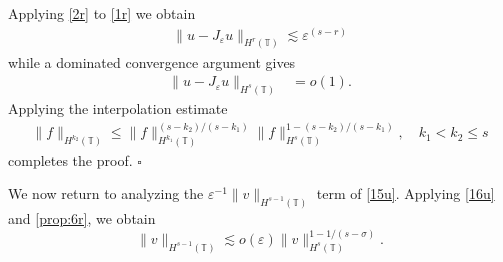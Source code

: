 \documentclass[12pt,reqno]{amsart}
\renewcommand{\qedsymbol}{\ensuremath{\square}}
\newcommand{\ci}{\mathbb{T}}
\newcommand{\ee}{\varepsilon}
\theoremstyle{plain}  %
\theoremstyle{definition}
\begin{document}
%
%
Applying \eqref{2r} to \eqref{1r} we obtain
%
%
\begin{equation*}
\label{2pr}
\begin{split}
\|u - J_\ee u\|_{H^r(\ci)}
\lesssim \ee^{(s-r)}
\end{split}
\end{equation*}
%
%
%
%
while a dominated convergence argument gives
%
%
\begin{equation*}
\label{o1}
\begin{split}
\|u - J_\ee u \|_{H^s(\ci) } & = o(1).
\end{split}
\end{equation*}
%
%
%
%
Applying the interpolation estimate 
%
%
\begin{equation}
\begin{split}
\|f\|_{H^{k_2}(\ci)} \le
\|f\|_{H^{k_1}(\ci)}^{(s-k_2)/(s -k_1 )}
\|f\|_{H^s(\ci)}^{1 - (s-k_2)/(s -k_1 )}, \quad k_1 < k_2 \le s
\label{16u}
\end{split}
\end{equation}
%
%
%
%
%
%
completes the proof. \qquad \qedsymbol 
%

We now return to analyzing the $\ee^{-1}
\|v\|_{H^{s-1}(\ci)} $ term of \eqref{15u}.
Applying \eqref{16u} and \autoref{prop:6r}, 
we obtain
%
%
%
%
$$
\|v\|_{H^{s-1}(\ci)}  \lesssim o(\ee) 
\|v\|_{H^s(\ci)}^{1-
1/(s- \sigma)}.
$$
\end{document}
